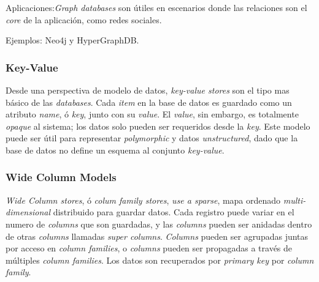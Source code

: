 Aplicaciones:\textit{Graph databases} son útiles en escenarios donde las relaciones son el \textit{core} de la aplicación, como redes sociales.

Ejemplos: Neo4j y HyperGraphDB.

\subsubsection{Key-Value}
\label{cap:justificacion_proyecto:base_datos:nosql:key_value}

Desde una perspectiva de modelo de datos, \textit{key-value stores} son el tipo mas básico de las \textit{ databases}. Cada \textit{item} en la base de datos es guardado como un atributo \textit{name}, ó \textit{key}, junto con su \textit{value}. El \textit{value}, sin embargo, es totalmente \textit{opaque} al sistema; los datos solo pueden ser requeridos desde la \textit{key}. Este modelo puede ser útil para representar \textit{polymorphic} y datos \textit{unstructured}, dado que la base de datos  no define un esquema al conjunto \textit{key-value}.

\subsubsection{Wide Column Models}
\label{cap:justificacion_proyecto:base_datos:nosql:wide_column_model}

\textit{Wide Column stores}, ó \textit{colum family stores}, \textit{use a sparse}, mapa ordenado \textit{multi-dimensional} distribuido para guardar datos. Cada registro puede variar en el numero de \textit{columns} que son guardadas, y las \textit{columns} pueden ser anidadas dentro de otras \textit{columns} llamadas \textit{super columns}. \textit{Columns} pueden ser agrupadas juntas por acceso en \textit{column families}, o \textit{columns} pueden ser propagadas a través de múltiples \textit{column families}. Los datos son recuperados por \textit{primary key} por \textit{column family}.

